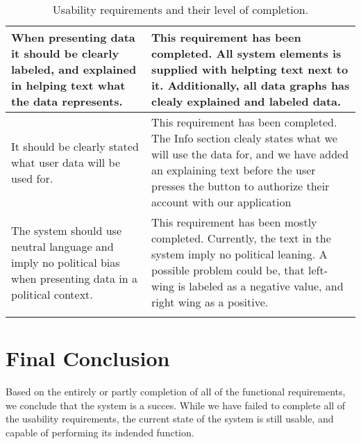 \begin{longtable}{|p{6cm}|p{8cm}|}
When presenting data it should be clearly labeled, and explained in
helping text what the data represents.
& This requirement has been completed. All system elements is supplied with
helpting text next to it. Additionally, all data graphs has clealy explained and
labeled data. \\\hline
It should be clearly stated what user data will be used for.
&	This requirement has been completed. The Info section clealy states what we
will use the data for, and we have added an explaining text before the user
presses the button to authorize their account with our application \\\hline
The system should use neutral language and imply no political bias when
presenting data in a political context.
&	This requirement has been mostly completed. Currently, the text in the system
imply no political leaning. A possible problem could be, that left-wing
is labeled as a negative value, and right wing as a positive.\\\hline
\caption{Usability requirements and their level of completion.}
\label{table:concUsaReq}
\end{longtable}

\section{Final Conclusion}
Based on the entirely or partly completion of all of the functional
requirements, we conclude that the system is a succes. While we have failed to
complete all of the usability requirements, the current state of the system is
still usable, and capable of performing its indended function.




















